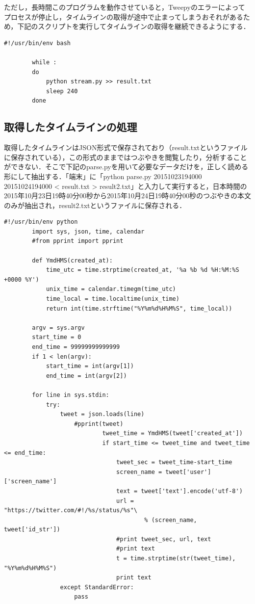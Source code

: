 ただし，長時間このプログラムを動作させていると，Tweepyのエラーによってプロセスが停止し，タイムラインの取得が途中で止まってしまうおそれがあるため，下記のスクリプトを実行してタイムラインの取得を継続できるようにする．
		
		\begin{lstlisting}[caption={}, label={}]
		#!/usr/bin/env bash
 
		while :
		do
			python stream.py >> result.txt
			sleep 240
		done
		\end{lstlisting}

\subsection{取得したタイムラインの処理}
取得したタイムラインはJSON形式で保存されており（result.txtというファイルに保存されている），この形式のままではつぶやきを閲覧したり，分析することができない．そこで下記のparse.pyを用いて必要なデータだけを，正しく読める形にして抽出する．「端末」に「python parse.py 20151023194000 20151024194000 < result.txt > result2.txt」と入力して実行すると，日本時間の2015年10月23日19時40分00秒から2015年10月24日19時40分00秒のつぶやきの本文のみが抽出され，result2.txtというファイルに保存される．
		
		\begin{lstlisting}[caption={}, label={}]
		#!/usr/bin/env python
		import sys, json, time, calendar
		#from pprint import pprint
 
		def YmdHMS(created_at):
			time_utc = time.strptime(created_at, '%a %b %d %H:%M:%S +0000 %Y')
			unix_time = calendar.timegm(time_utc)
			time_local = time.localtime(unix_time)
			return int(time.strftime("%Y%m%d%H%M%S", time_local))
 
		argv = sys.argv
		start_time = 0
		end_time = 99999999999999
		if 1 < len(argv):
			start_time = int(argv[1])
			end_time = int(argv[2])
 
		for line in sys.stdin:
			try:
				tweet = json.loads(line)
        			#pprint(tweet)
            				tweet_time = YmdHMS(tweet['created_at'])
            				if start_time <= tweet_time and tweet_time <= end_time:
                				tweet_sec = tweet_time-start_time
                				screen_name = tweet['user']['screen_name']
                				text = tweet['text'].encode('utf-8')
                				url = "https://twitter.com/#!/%s/status/%s"\
                    					% (screen_name, tweet['id_str'])
                				#print tweet_sec, url, text
                				#print text
                				t = time.strptime(str(tweet_time), "%Y%m%d%H%M%S")
                				print text
    			except StandardError:
        			pass
		\end{lstlisting}
		
